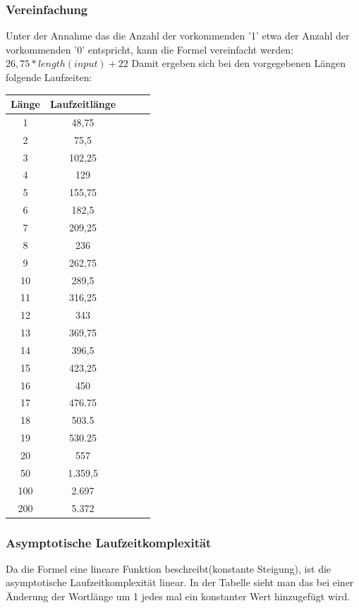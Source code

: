 \subsubsection*{Vereinfachung}
Unter der Annahme das die Anzahl der vorkommenden '1' etwa der Anzahl der vorkommenden '0' entspricht, kann die Formel vereinfacht werden: $26,75 * length(input) + 22 $ 
\newline
\newline
Damit ergeben sich bei den vorgegebenen Längen folgende Laufzeiten:

\begin{center}
\begin{tabular}{|c|c|c|c|c|}
\hline
Länge    & Laufzeitlänge \\ \hline 
1     & 48,75 	\\ \hline 
2     & 75,5 	\\ \hline 
3     & 102,25 	\\ \hline 
4     & 129 	\\ \hline 
5     & 155,75 	\\ \hline 
6     & 182,5 	\\ \hline 
7     & 209,25 	\\ \hline 
8     & 236 	    \\ \hline 
9     & 262,75 	\\ \hline 
10    & 289,5 	\\ \hline 
11    & 316,25 	\\ \hline 
12    & 343 	\\ \hline 
13    & 369,75 	\\ \hline 
14    & 396,5 	\\ \hline 
15    & 423,25 	\\ \hline 
16    & 450 	\\ \hline 
17    & 476.75 	\\ \hline 
18    & 503.5 	\\ \hline 
19    & 530.25 	\\ \hline 
20    & 557	    \\ \hline 
50    & 1.359,5	\\ \hline 
100   & 2.697	    \\ \hline 
200	  & 5.372	\\ \hline 

\end{tabular}
\end{center}

\subsubsection*{Asymptotische Laufzeitkomplexität}
Da die Formel eine lineare Funktion beschreibt(konstante Steigung), ist die asymptotische Laufzeitkomplexität linear. In der Tabelle sieht man das bei einer Änderung der Wortlänge um 1 jedes mal ein konstanter Wert hinzugefügt wird.

